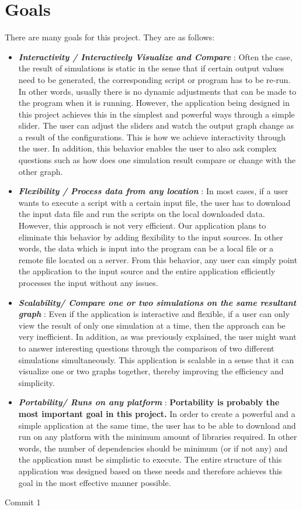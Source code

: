 \section*{Goals}

There are many goals for this project. They are as follows:

\begin{itemize}
    \item \textbf{\textit{Interactivity / Interactively Visualize and Compare} }: Often the case, the result of simulations is static in the sense that if certain output values need to be generated, the corresponding script or program has to be re-run. In other words, usually there is no dynamic adjustments that can be made to the program when it is running. However, the application being designed in this project achieves this in the simplest and powerful ways through a simple slider. The user can adjust the sliders and watch the output graph change as a result of the configurations. This is how we achieve interactivity through the user. In addition, this behavior enables the user to also ask complex questions such as how does one simulation result compare or change with the other graph.
    
    \item \textbf{\textit{Flexibility / Process data from any location} }: In most cases, if a user wants to execute a script with a certain input file, the user has to download the input data file and run the scripts on the local downloaded data. However, this approach is not very efficient. Our application plans to eliminate this behavior by adding flexibility to the input sources. In other words, the data which is input into the program can be a local file or a remote file located on a server. From this behavior, any user can simply point the application to the input source and the entire application efficiently processes the input without any issues. 
    
    \item \textbf{\textit{Scalability/ Compare one or two simulations on the same resultant graph} }: Even if the application is interactive and flexible, if a user can only view the result of only one simulation at a time, then the approach can be very inefficient. In addition, as was previously explained, the user might want to answer interesting questions through the comparison of two different simulations simultaneously. This application is scalable in a sense that it can visualize one or two graphs together, thereby improving the efficiency and simplicity. 
    
    \item \textbf{\textit{Portability/ Runs on any platform} }: \textbf{Portability is probably the most important goal in this project.} In order to create a powerful and a simple application at the same time, the user has to be able to download and run on any platform with the minimum amount of libraries required. In other words, the number of dependencies should be minimum (or if not any) and the application must be simplistic to execute. The entire structure of this application was designed based on these needs and therefore achieves this goal in the most effective manner possible.   
\end{itemize}


Commit 1